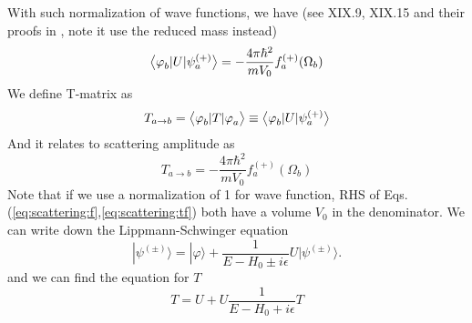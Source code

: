 With such  normalization of wave functions, we have (see XIX.9, XIX.15 and their proofs in \cite{Messiah}, note it use the reduced mass instead)
\begin{equation}\label{eq:scattering:f}
\bigl<{\varphi_{b}^{}{\lvert{U}\rvert}\psi_{a}^{(+)}}\bigr>=-\frac{4\pi\hbar^{2}}{mV_{0}}f_{a}^{(+)}(\Omega_{b})
\end{equation}
We define  T-matrix  as 
\begin{equation}
T_{a\rightarrow{b}}=\bigl<{\varphi_{b}^{}{\lvert{T}\rvert}\varphi_{a}^{}}\bigr>\equiv\bigl<{\varphi_{b}^{}{\lvert{U}\rvert}\psi_{a}^{(+)}}\bigr>
\end{equation}
And it relates to scattering amplitude as 
\begin{equation}\label{eq:scattering:tf}
T_{a\rightarrow{b}}=-\frac{4\pi\hbar^{2}}{mV_{0}}f_{a}^{(+)}(\Omega_{b})
\end{equation}
Note that if we use a normalization of 1 for wave function, RHS of Eqs. (\ref{eq:scattering:f},\ref{eq:scattering:tf}) both have a volume $V_0$ in the denominator. We can write down the Lippmann-Schwinger equation 
\begin{equation}
  | \psi^{(\pm)} \rangle = | \varphi \rangle + \frac{1}{E - H_0 \pm i \epsilon} U |\psi^{(\pm)} \rangle. 
\label{eq:}
\end{equation}
  and we can find the equation for $T$
	\begin{equation}
	T=U+U\frac{1}{E-H_0+i\epsilon}T
	\label{eq:}
	\end{equation}
	

